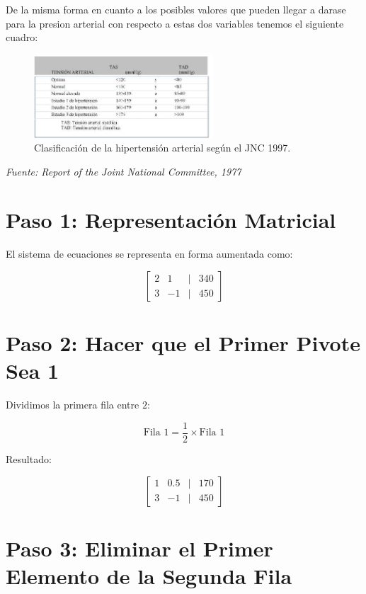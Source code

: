 \documentclass[a4paper,10pt]{article}
\begin{document}
De la misma forma en cuanto a los posibles valores que pueden llegar a darase para la presion arterial con respecto a estas dos variables tenemos el siguiente cuadro:

\vspace{1em}
\begin{figure}[H]
    \centering
    \includegraphics[width=0.6\textwidth]{clasificacion_jnc.png}
    \caption{Clasificación de la hipertensión arterial según el JNC 1997.}
    \label{fig:jnc1997}
\end{figure}
\textit{Fuente: Report of the Joint National Committee, 1977}
\vspace{2em}

\section*{Paso 1: Representación Matricial}

El sistema de ecuaciones se representa en forma aumentada como:

\[
\begin{bmatrix}
2 & 1 & | & 340 \\
3 & -1 & | & 450
\end{bmatrix}
\]

\section*{Paso 2: Hacer que el Primer Pivote Sea 1}

Dividimos la primera fila entre \(2\):

\[
\text{Fila 1} = \frac{1}{2} \times \text{Fila 1}
\]

Resultado:

\[
\begin{bmatrix}
1 & 0.5 & | & 170 \\
3 & -1 & | & 450
\end{bmatrix}
\]

\section*{Paso 3: Eliminar el Primer Elemento de la Segunda Fila}
\end{document}

